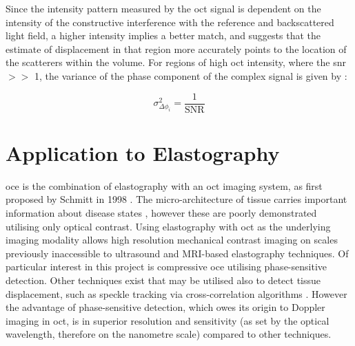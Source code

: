 Since the intensity pattern measured by the \ac{oct} signal is dependent on the intensity of the constructive interference with the reference and backscattered light field, a higher intensity implies a better match, and suggests that the estimate of displacement in that region more accurately points to the location of the scatterers within the volume. For regions of high \ac{oct} intensity, where the \ac{snr} $>>$ 1, the variance of the phase component of the complex signal is given by \cite{goodman_statistical_2015}:

\begin{equation}
	\sigma^2_{\Delta\phi_i} = \frac{1}{\text{SNR}}
	\label{snr_variance}
\end{equation}

\section{Application to Elastography}\label{application_elastography}



\ac{oce} is the combination of elastography with an \ac{oct} imaging system, as first proposed by Schmitt in 1998 \cite{schmitt_oct_1998}. The micro-architecture of tissue carries important information about disease states \cite{fung_biomechanics_1981}, however these are poorly demonstrated utilising only optical contrast. Using elastography with \ac{oct} as the underlying imaging modality allows high resolution mechanical contrast imaging on scales previously inaccessible to ultrasound and MRI-based elastography techniques. Of particular interest in this project is compressive \ac{oce} utilising phase-sensitive detection. Other techniques exist that may be utilised also to detect tissue displacement, such as speckle tracking via cross-correlation algorithms \cite{kennedy_review_2014}. However the advantage of phase-sensitive detection, which owes its origin to Doppler imaging in \ac{oct}, is in superior resolution and sensitivity (as set by the optical wavelength, therefore on the nanometre scale) compared to other techniques. 

